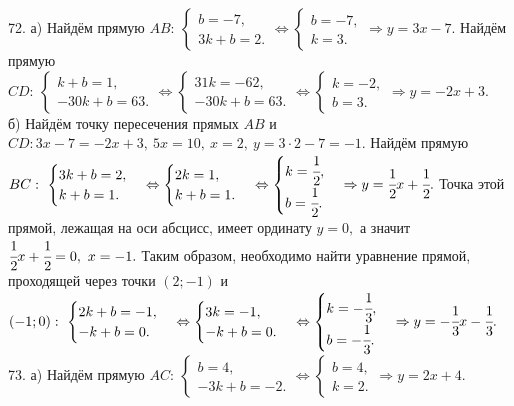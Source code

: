 72. а) Найдём прямую $AB:\ \begin{cases} b=-7,\\ 3k+b=2.\end{cases}\Leftrightarrow\begin{cases} b=-7,\\ k=3.\end{cases}\Rightarrow y=3x-7.$
Найдём прямую $CD:\ \begin{cases} k+b=1,\\ -30k+b=63.\end{cases}\Leftrightarrow\begin{cases} 31k=-62,\\ -30k+b=63.\end{cases}
\Leftrightarrow\begin{cases} k=-2,\\ b=3.\end{cases}\Rightarrow y=-2x+3.$\\
б) Найдём точку пересечения прямых $AB$ и $CD: 3x-7=-2x+3,\ 5x=10,\ x=2,\ y=3\cdot2-7=-1.$ Найдём прямую $BC:\ \begin{cases} 3k+b=2,\\ k+b=1.\end{cases}\Leftrightarrow\begin{cases} 2k=1,\\ k+b=1.\end{cases}\Leftrightarrow\begin{cases} k=\cfrac{1}{2},\\ b=\cfrac{1}{2}.\end{cases}\Rightarrow y=\cfrac{1}{2}x+\cfrac{1}{2}.$ Точка этой прямой, лежащая на оси абсцисс, имеет ординату $y=0,$ а значит $\cfrac{1}{2}x+\cfrac{1}{2}=0,\ x=-1.$ Таким образом, необходимо найти уравнение прямой, проходящей через точки $(2;-1)$ и $(-1;0): \ \begin{cases} 2k+b=-1,\\ -k+b=0.\end{cases}\Leftrightarrow\begin{cases} 3k=-1,\\ -k+b=0.\end{cases}\Leftrightarrow\begin{cases} k=-\cfrac{1}{3},\\ b=-\cfrac{1}{3}.\end{cases}\Rightarrow y=-\cfrac{1}{3}x-\cfrac{1}{3}.$\\
73. а) Найдём прямую $AC:\ \begin{cases} b=4,\\ -3k+b=-2.\end{cases}\Leftrightarrow\begin{cases} b=4,\\ k=2.\end{cases}\Rightarrow y=2x+4.$
